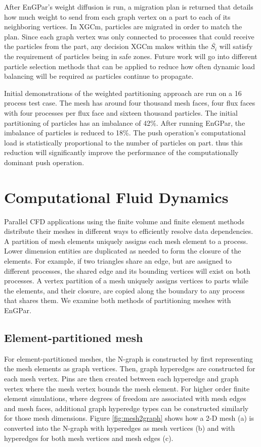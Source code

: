 \documentclass[conference]{IEEEtran}
\begin{document}
After EnGPar's weight diffusion is run, a migration plan is returned that details how
much weight to send from each graph vertex on a part to each of its neighboring vertices.
In XGCm, particles are migrated in order to match the plan. Since each graph vertex was only
connected to processes that could receive the particles from the part, any decision XGCm makes
within the $\bar{S_i}$ will satisfy the requirement of particles being in safe zones. Future work
will go into different particle selection methods that can be applied to reduce how often
dynamic load balancing will be required as particles continue to propagate.

Initial demonstrations of the weighted partitioning approach are run on a 16
process test case. The mesh has around four thousand
mesh faces, four flux faces with four processes per flux face and sixteen thousand particles.
The initial partitioning of particles has an imbalance of 42\%. After running EnGPar, the
imbalance of particles is reduced to 18\%. The push operation's computational load is
statistically proportional to the number of particles on part. thus this
reduction will significantly improve the performance of the computationally
dominant push operation.

\section{Computational Fluid Dynamics} \label{sec:cfd}

Parallel CFD applications using the
finite volume and finite element methods distribute their meshes in different
ways to efficiently resolve data dependencies.
A partition of mesh elements uniquely assigns each mesh element to a process.
Lower dimension entities are duplicated as needed to form the closure of the
elements.
For example, if two triangles share an edge, but are assigned to different
processes, the shared edge and its bounding vertices will exist on both
processes.
A vertex partition of a mesh uniquely assigns vertices to parts while the
elements, and their closure, are copied along the boundary to any process that
shares them.
We examine both methods of partitioning meshes with EnGPar.

\subsection{Element-partitioned mesh}

For element-partitioned meshes, the N-graph is constructed by first representing the mesh elements
as graph vertices. Then, graph hyperedges are constructed for each mesh vertex. Pins
are then created between each hyperedge and graph vertex where the mesh vertex bounds the
mesh element. For higher order finite element simulations, where degrees of freedom are
associated with mesh edges and mesh faces, additional graph hyperedge types can be constructed
similarly for those mesh dimensions. Figure \ref{fig:mesh2graph} shows how a 2-D mesh (a)
is converted into the N-graph with hyperedges as mesh vertices (b) and with hyperedges for
both mesh vertices and mesh edges (c).
\end{document}
